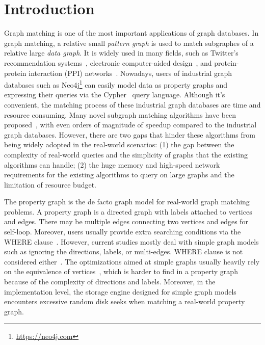\section{Introduction}
Graph matching
is one of the most important applications of graph databases. In graph matching, a relative small \emph{pattern graph} is used to match subgraphes of a relative large \emph{data graph}.
It is widely used in many fields,
such as Twitter's recommendation systems~\cite{DBLP:journals/pvldb/GuptaSGGZLL14,DBLP:journals/pvldb/SharmaJBLL16},
electronic computer-aided design~\cite{DBLP:conf/dac/OhlrichEGS93},
and protein-protein interaction (PPI) networks~\cite{milenkovic2008uncovering}.
Nowadays, users of industrial graph databases such as Neo4j\footnote{\url{https://neo4j.com}}
can easily model data as property graphs and expressing their queries via the Cypher~\cite{DBLP:conf/sigmod/FrancisGGLLMPRS18} query language.
Although it's convenient, the matching process of these industrial graph databases are time and resource consuming.
Many novel subgraph matching algorithms have been proposed~\cite{DBLP:journals/pvldb/SunWWSL12,DBLP:conf/sigmod/HanLL13,DBLP:conf/sigmod/ShaoCCMYX14,DBLP:conf/cloud/SerafiniMS17,DBLP:journals/pvldb/QiaoZC17,DBLP:conf/sigmod/DiasTGM019}, with even orders of magnitude of speedup compared to the industrial graph databases.
However, there are two gaps that hinder these algorithms from being widely adopted in the real-world scenarios:
(1) the gap between the complexity of real-world queries and the simplicity of graphs that the existing algorithms can handle;
(2) the huge memory and high-speed network requirements for the existing algorithms to query on large graphs and the limitation of resource budget.

The property graph is the de facto graph model for real-world graph matching problems.
A property graph is a directed graph with labels attached to vertices and edges.
There may be multiple edges connecting two vertices and edges for self-loop.
Moreover, users usually provide extra searching conditions via the WHERE clause~\cite{DBLP:journals/csur/AnglesABHRV17}. However,  current studies mostly deal with simple graph models such as ignoring the directions, labels, or multi-edges. WHERE clause is not considered either~\cite{DBLP:journals/pvldb/SunWWSL12,DBLP:conf/sigmod/HanLL13,DBLP:conf/sigmod/KimLBHLKJ16,DBLP:journals/pvldb/QiaoZC17,DBLP:journals/pvldb/MhedhbiS19}. The optimizations aimed at simple graphs usually heavily rely on the equivalence of vertices~\cite{DBLP:conf/sigmod/HanLL13,DBLP:journals/pvldb/QiaoZC17}, which is harder to find in a property graph because of the complexity of directions and labels. Moreover, in the implementation level, the storage engine designed for simple graph models encounters excessive random disk seeks when matching a real-world property graph.

